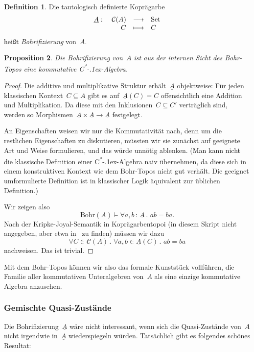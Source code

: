 \documentclass[a4paper,ngerman,12pt]{scrartcl}
\theoremstyle{definition}
\newtheorem{defn}{Definition}[section]
\theoremstyle{plain}
\newtheorem{prop}[defn]{Proposition}
\theoremstyle{remark}
\newcommand{\C}{\mathcal{C}}
\newcommand{\Bohr}{\mathrm{Bohr}}
\newcommand{\ul}[1]{\underline{#1}}
\newcommand{\csalgebra}{C\textsuperscript{*}\kern-.1ex-Algebra}
\newcommand{\Set}{\mathrm{Set}}
\renewcommand{\_}{\mathpunct{.}\,}
\newcommand{\?}{\,{:}\,}
\begin{document}
\begin{defn}Die tautologisch definierte Koprägarbe
\[ \begin{array}{@{}rrcl@{}}
  \ul{A}:\ & \C(A) &\longrightarrow& \Set \\
  & C &\longmapsto& C
\end{array} \]
heißt \emph{Bohrifizierung} von~$A$.\end{defn}
\begin{prop}Die Bohrifizierung von~$A$
ist aus der internen Sicht des Bohr-Topos eine \emph{kommutative} \csalgebra.
\end{prop}
\begin{proof}Die additive und multiplikative Struktur erhält~$\ul{A}$
objektweise: Für jeden klassischen Kontext~$C \subseteq A$ gibt es
auf~$\ul{A}(C) = C$ offensichtlich eine Addition und Multiplikation. Da diese
mit den Inklusionen~$C \subseteq C'$ verträglich sind, werden so
Morphismen~$\ul{A} \times \ul{A} \to \ul{A}$ festgelegt.

An Eigenschaften weisen wir nur die Kommutativität nach, denn um die restlichen
Eigenschaften zu diskutieren, müssten wir sie zunächst auf geeignete Art und
Weise formulieren, und das würde unnötig ablenken. (Man kann nicht die
klassische Definition einer \csalgebra{} naiv übernehmen, da diese sich in
einem konstruktiven Kontext wie dem Bohr-Topos nicht gut verhält. Die geeignet
umformulierte Definition ist in klassischer Logik äquivalent zur üblichen
Definition.)

Wir zeigen also
\[ \Bohr(A) \models \forall a,b\?\ul{A}\_ a b = b a. \]
Nach der Kripke-Joyal-Semantik in Koprägarbentopoi (in diesem Skript nicht
angegeben, aber etwa in~\cite[Seite~100f.]{streicher:ctcl} zu finden) müssen wir dazu
\[ \forall C \in \C(A)\_ \forall a,b \in \ul{A}(C)\_ a b = b a \]
nachweisen. Das ist trivial.\end{proof}

Mit dem Bohr-Topos können wir also das formale Kunststück vollführen, die
Familie aller kommutativen Unteralgebren von~$A$ als eine einzige kommutative
Algebra anzusehen.


\subsubsection*{Gemischte Quasi-Zustände}

Die Bohrifizierung~$\ul{A}$ wäre nicht interessant, wenn sich die Quasi-Zustände
von~$A$ nicht irgendwie in~$\ul{A}$ wiederspiegeln würden. Tatsächlich gibt es
folgendes schönes Resultat:
\end{document}

